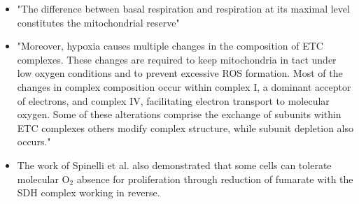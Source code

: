 \documentclass[11pt,a4paper]{article}
\begin{document}
\begin{itemize}
\item "The difference between basal respiration and
respiration at its maximal level constitutes the mitochondrial reserve"\cite{Marchetti2020}
\item "Moreover, hypoxia causes multiple changes in the
composition of ETC complexes. These changes are required to keep mitochondria in tact under low oxygen conditions and to prevent excessive ROS formation. Most of the changes in complex composition occur within complex I, a dominant acceptor of electrons, and complex IV, facilitating electron transport to molecular oxygen. Some of these alterations comprise the exchange of subunits within ETC complexes others modify complex structure, while subunit depletion also occurs." \cite{Fuhrmann2017}
\item The work of Spinelli et al. also demonstrated that some cells can tolerate molecular O$_{2}$ absence for proliferation through reduction of fumarate with the SDH complex working in reverse. \cite{Spinelli2021}
\end{itemize}
\end{document}
